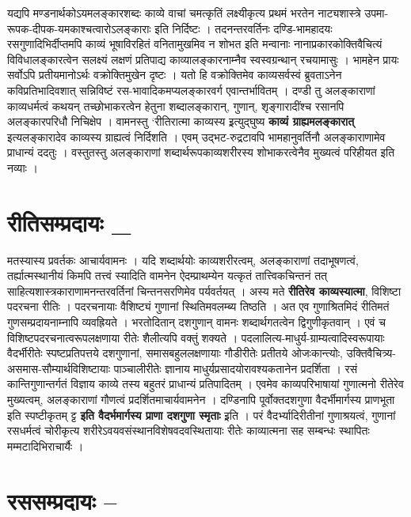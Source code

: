 यद्यपि मण्डनार्थकोऽयमलङ्कारशब्दः काव्ये वाचां चमत्कृतिं लक्ष्यीकृत्य प्रथमं भरतेन नाट्यशास्त्रे उपमा-रूपक-दीपक-यमकाश्चत्वारोऽलङ्काराः इति निर्दिष्टः । तदनन्तरवर्तिनः दण्डि-भामहादयः रसगुणादिभिर्दीप्तमपि काव्यं भूषाविरहितं वनितामुखमिव न शोभत इति मन्वानाः नानाप्रकारकोक्तिवैचित्यं विविधालङ्कारत्वेन सलक्ष्यं लक्षणं प्रतिपाद्य काव्यालङ्कारनाम्नैव स्वस्वग्रन्थान् रचयामासुः । भामहेन प्रायः सर्वोऽपि प्रतीयमानोऽर्थः वक्रोक्तिमुखेन दृष्टः । यतो हि वक्रोक्तिमेव काव्यसर्वस्वं ब्रुवताऽनेन कविप्रतिभादिवशात् सन्निविष्टं रस-भावादिकमप्यलङ्कारवर्ग एवान्तर्भावितम् । दण्डी तु अलङ्काराणां काव्यधर्मत्वं कथयन् तच्छोभाकरत्वेन हेतुना शब्दालङ्कारान्, गुणान्, शृङ्गारादींश्च रसानपि अलङ्कारपरिधौ निचिक्षेप । वामनस्तु ‘रीतिरात्मा काव्यस्य इ्रत्युद्घुष्य \textbf{काव्यं ग्राह्यमलङ्कारात्} इत्यलङ्कारादेव काव्यस्य ग्राह्यत्वं निर्दिशति ।   एवम् उद्भट-रुद्रटावपि भामहानुवर्तिनौ अलङ्काराणामेव प्राधान्यं ददतुः । वस्तुतस्तु अलङ्काराणां शब्दार्थरूपकाव्यशरीरस्य  शोभाकरत्वेनैव मुख्यत्वं परिहीयत इति नव्याः ।

\section*{ रीतिसम्प्रदायः \_}

मतस्यास्य प्रवर्तकः आचार्यवामनः । यदि शब्दार्थयोः काव्यशरीरत्वम्, अलङ्काराणां तदाभूषणत्वं, तर्ह्यात्मस्थानीयं किमपि तत्त्वं स्यादिति वामनेन ऐदम्प्राथम्येन यत्कृतं तात्त्विकचिन्तनं तत् साहित्यशास्त्रकाराणामनन्तरवर्तिनां चिन्तनसरणिमेव पर्यवर्तयत् । अस्य मते \textbf{रीतिरेव काव्यस्यात्मा}, विशिष्टा पदरचना रीतिः । पदरचनायाः वैशिष्ट्यं गुणानां स्थितिमवलम्ब्य तिष्ठति । अत एव गुणाश्रितमिदं रीतिमतं गुणसम्प्रदायनाम्नापि व्यवह्रियते । भरतोदितान् दशगुणान् वामनः शब्दार्थगतत्वेन द्विगुणीकृतवान् । एवं च विशिष्टपदरचनात्वरूपलक्षणाया रीतेः शैलीत्यपि वक्तुं शक्यते । पदलालित्य-माधुर्य-ग्राम्यत्वादिस्वरूपायाः वैदर्भीरीतेः स्पष्टप्रतिपत्तये दशगुणानां, समासबहुललक्षणायाः गौडीरीतेः प्रतीतये ओजःकान्त्योः, उक्तिवैचित्र्य-असमास-सौम्यार्थविशिष्टायाः पाञ्चालीरीतेः ज्ञानाय माधुर्यप्रसादयोरावश्यकतानेन प्रदर्शिता । रसं कान्तिगुणान्तर्गतं विज्ञाय काव्ये तस्य बहुतरं प्राधान्यं प्रतिपादितम् । एवमेव काव्यपरिभाषायां गुणात्मनो रीतेरेव मुख्यत्वम्, अलङ्काराणां गौणत्वं प्रदर्शितमाचार्यवामनेन । दण्डिनापि पूर्वोक्तदशगुणा वैदर्भीमार्गस्य प्राणभूता इति स्पष्टीकृतम् ट्ट \textbf{इति वैदर्भमार्गस्य प्राणा दशगुणा स्मृताः} इ्रति । परं वैदर्भ्यादिरीतीनां गुणाश्रयत्वं, गुणानां रसधर्मत्वं चोरीकृत्य शरीरेऽवयवसंस्थानविशेषवदवस्थितायाः रीतेः काव्यात्मना सह सम्बन्धः स्थापितः मम्मटादिभिराचार्यैः ।

\section*{ रससम्प्रदायः --}


